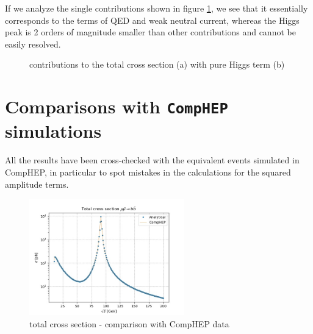 \documentclass[12pt,letterpaper]{article}
\begin{document}
If we analyze the single contributions shown in figure \ref{totalCS_terms}, we see that it essentially corresponds to the terms of QED and weak neutral current, whereas the Higgs peak is 2 orders of magnitude smaller than other contributions and cannot be easily resolved. 

\begin{figure}
\centering
{}
\caption{contributions to the total cross section (a) with pure Higgs term (b)}
\label{totalCS_terms}
\end{figure}


\section{Comparisons with \texttt{CompHEP} simulations}

All the results have been cross-checked with the equivalent events simulated in CompHEP, in particular to spot mistakes in the calculations for the squared amplitude terms. 

\begin{figure}[!ht]
\centering
\includegraphics[width=0.6\textwidth]{figures/TotalCS_CH.jpg}
\caption{total cross section - comparison with CompHEP data}
\label{totalCS_ch}
\end{figure}
\end{document}
